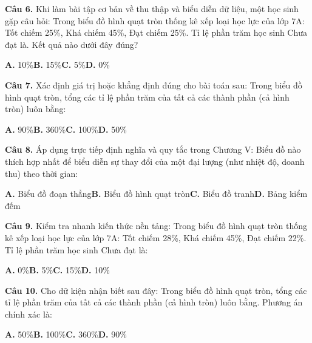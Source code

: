 \documentclass[11pt,a4paper]{article}
\begin{document}
\textbf{\color{primary} Câu 6.} Khi làm bài tập cơ bản về thu thập và biểu diễn dữ liệu, một học sinh gặp câu hỏi: Trong biểu đồ hình quạt tròn thống kê xếp loại học lực của lớp 7A: Tốt chiếm 25\%, Khá chiếm 45\%, Đạt chiếm 25\%. Tỉ lệ phần trăm học sinh Chưa đạt là. Kết quả nào dưới đây đúng?\par
\hspace*{1.5em}\textbf{A.} 10\%\quad\quad \textbf{B.} 15\%\quad\quad \textbf{C.} 5\%\quad\quad \textbf{D.} 0\%\par\vspace{2pt}
\textbf{\color{primary} Câu 7.} Xác định giá trị hoặc khẳng định đúng cho bài toán sau: Trong biểu đồ hình quạt tròn, tổng các tỉ lệ phần trăm của tất cả các thành phần (cả hình tròn) luôn bằng:\par
\hspace*{1.5em}\textbf{A.} 90\%\quad\quad \textbf{B.} 360\%\quad\quad \textbf{C.} 100\%\quad\quad \textbf{D.} 50\%\par\vspace{2pt}
\textbf{\color{primary} Câu 8.} Áp dụng trực tiếp định nghĩa và quy tắc trong Chương V: Biểu đồ nào thích hợp nhất để biểu diễn sự thay đổi của một đại lượng (như nhiệt độ, doanh thu) theo thời gian:\par
\hspace*{1.5em}\textbf{A.} Biểu đồ đoạn thẳng\quad\quad \textbf{B.} Biểu đồ hình quạt tròn\quad\quad \textbf{C.} Biểu đồ tranh\quad\quad \textbf{D.} Bảng kiểm đếm\par\vspace{2pt}
\textbf{\color{primary} Câu 9.} Kiểm tra nhanh kiến thức nền tảng: Trong biểu đồ hình quạt tròn thống kê xếp loại học lực của lớp 7A: Tốt chiếm 28\%, Khá chiếm 45\%, Đạt chiếm 22\%. Tỉ lệ phần trăm học sinh Chưa đạt là:\par
\hspace*{1.5em}\textbf{A.} 0\%\quad\quad \textbf{B.} 5\%\quad\quad \textbf{C.} 15\%\quad\quad \textbf{D.} 10\%\par\vspace{2pt}
\textbf{\color{primary} Câu 10.} Cho dữ kiện nhận biết sau đây: Trong biểu đồ hình quạt tròn, tổng các tỉ lệ phần trăm của tất cả các thành phần (cả hình tròn) luôn bằng. Phương án chính xác là:\par
\hspace*{1.5em}\textbf{A.} 50\%\quad\quad \textbf{B.} 100\%\quad\quad \textbf{C.} 360\%\quad\quad \textbf{D.} 90\%\par\vspace{2pt}
\end{document}

